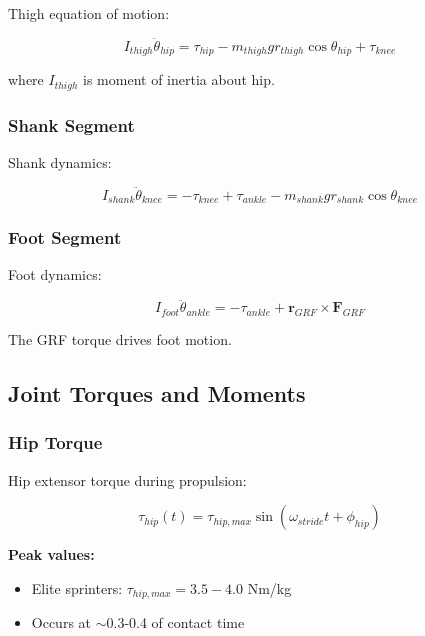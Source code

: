Thigh equation of motion:

\begin{equation}
I_{thigh} \ddot{\theta}_{hip} = \tau_{hip} - m_{thigh} g r_{thigh} \cos\theta_{hip} + \tau_{knee}
\label{eq:thigh_dynamics}
\end{equation}

where $I_{thigh}$ is moment of inertia about hip.

\subsubsection{Shank Segment}

Shank dynamics:

\begin{equation}
I_{shank} \ddot{\theta}_{knee} = -\tau_{knee} + \tau_{ankle} - m_{shank} g r_{shank} \cos\theta_{knee}
\label{eq:shank_dynamics}
\end{equation}

\subsubsection{Foot Segment}

Foot dynamics:

\begin{equation}
I_{foot} \ddot{\theta}_{ankle} = -\tau_{ankle} + \mathbf{r}_{GRF} \times \mathbf{F}_{GRF}
\label{eq:foot_dynamics}
\end{equation}

The GRF torque drives foot motion.

\subsection{Joint Torques and Moments}

\subsubsection{Hip Torque}

Hip extensor torque during propulsion:

\begin{equation}
\tau_{hip}(t) = \tau_{hip,max} \sin(\omega_{stride} t + \phi_{hip})
\label{eq:hip_torque}
\end{equation}

\textbf{Peak values:}
\begin{itemize}
\item Elite sprinters: $\tau_{hip,max} = 3.5-4.0$ Nm/kg
\item Occurs at $\sim$0.3-0.4 of contact time
\end{itemize}

